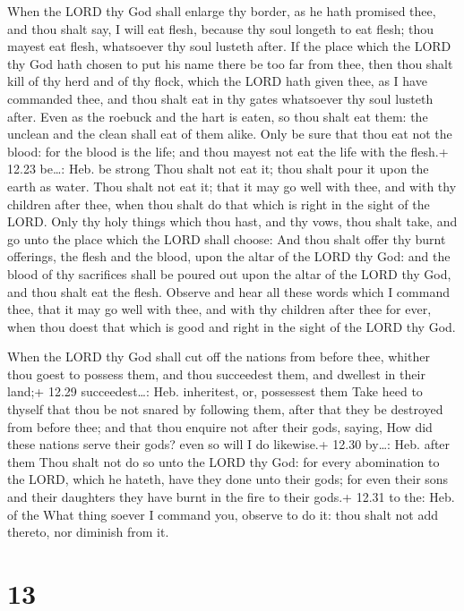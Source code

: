  When the LORD thy God shall enlarge thy border, as he
hath promised thee, and thou shalt say, I will eat flesh, because thy
soul longeth to eat flesh; thou mayest eat flesh, whatsoever thy soul
lusteth after.  If the place which the LORD thy God hath
chosen to put his name there be too far from thee, then thou shalt kill
of thy herd and of thy flock, which the LORD hath given thee, as I have
commanded thee, and thou shalt eat in thy gates whatsoever thy soul
lusteth after.  Even as the roebuck and the hart is eaten,
so thou shalt eat them: the unclean and the clean shall eat of them
alike.  Only be sure that thou eat not the blood: for the
blood is the life; and thou mayest not eat the life with the flesh.+
12.23 be\ldots: Heb. be strong  Thou shalt not eat it; thou
shalt pour it upon the earth as water.  Thou shalt not eat
it; that it may go well with thee, and with thy children after thee,
when thou shalt do that which is right in the sight of the LORD.
 Only thy holy things which thou hast, and thy vows, thou
shalt take, and go unto the place which the LORD shall choose:
 And thou shalt offer thy burnt offerings, the flesh and
the blood, upon the altar of the LORD thy God: and the blood of thy
sacrifices shall be poured out upon the altar of the LORD thy God, and
thou shalt eat the flesh.  Observe and hear all these words
which I command thee, that it may go well with thee, and with thy
children after thee for ever, when thou doest that which is good and
right in the sight of the LORD thy God.

 When the LORD thy God shall cut off the nations from
before thee, whither thou goest to possess them, and thou succeedest
them, and dwellest in their land;+ 12.29 succeedest\ldots: Heb.
inheritest, or, possessest them  Take heed to thyself that
thou be not snared by following them, after that they be destroyed from
before thee; and that thou enquire not after their gods, saying, How did
these nations serve their gods? even so will I do likewise.+ 12.30
by\ldots: Heb. after them  Thou shalt not do so unto the
LORD thy God: for every abomination to the LORD, which he hateth, have
they done unto their gods; for even their sons and their daughters they
have burnt in the fire to their gods.+ 12.31 to the: Heb. of the
 What thing soever I command you, observe to do it: thou
shalt not add thereto, nor diminish from it.

\hypertarget{section-12}{%
\section{13}\label{section-12}}

